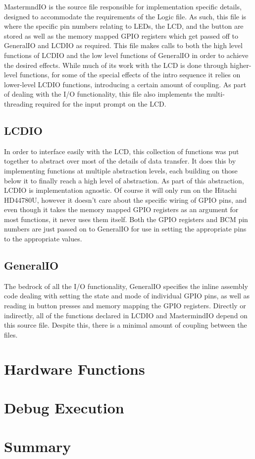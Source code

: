 \documentclass[a4paper, titlepage]{article}
\begin{document}
MastermndIO is the source file responsible for implementation specific details, designed to accommodate the requirements of the Logic file. As such, this file is where the specific pin numbers relating to LEDs, the LCD, and the button are stored as well as the memory mapped GPIO registers which get passed off to GeneralIO and LCDIO as required. This file makes calls to both the high level functions of LCDIO and the low level functions of GeneralIO in order to achieve the desired effects. While much of its work with the LCD is done through higher-level functions, for some of the special effects of the intro sequence it relies on lower-level LCDIO functions, introducing a certain amount of coupling. As part of dealing with the I/O functionality, this file also implements the multi-threading required for the input prompt on the LCD.

\subsection{LCDIO}

In order to interface easily with the LCD, this collection of functions was put together to abstract over most of the details of data transfer. It does this by implementing functions at multiple abstraction levels, each building on those below it to finally reach a high level of abstraction. As part of this abstraction, LCDIO is implementation agnostic. Of course it will only run on the Hitachi HD44780U, however it doesn't care about the specific wiring of GPIO pins, and even though it takes the memory mapped GPIO registers as an argument for most functions, it never uses them itself. Both the GPIO registers and BCM pin numbers are just passed on to GeneralIO for use in setting the appropriate pins to the appropriate values.

\subsection{GeneralIO}

The bedrock of all the I/O functionality, GeneralIO specifies the inline assembly code dealing with setting the state and mode of individual GPIO pins, as well as reading in button presses and memory mapping the GPIO registers. Directly or indirectly, all of the functions declared in LCDIO and MastermindIO depend on this source file. Despite this, there is a minimal amount of coupling between the files.

\section{Hardware Functions}

\section{Debug Execution}

\section{Summary}
\end{document}
